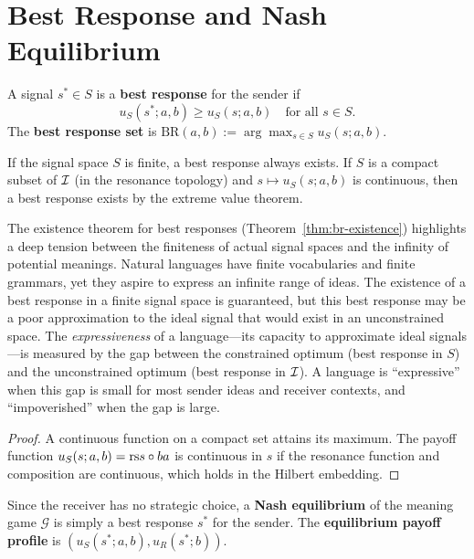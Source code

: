 \section{Best Response and Nash Equilibrium}

\begin{definition}
\label{def:best-response}
A signal $s^* \in S$ is a \textbf{best response} for the sender if
\[
  u_S(s^*; a, b) \geq u_S(s; a, b) \quad \text{for all } s \in S.
\]
The \textbf{best response set} is
$\mathrm{BR}(a, b) := \arg\max_{s \in S} u_S(s; a, b)$.
\end{definition}

\begin{theorem}
\label{thm:br-existence}
If the signal space $S$ is finite, a best response always exists.
If $S$ is a compact subset of $\mathcal{I}$ (in the resonance topology) and
$s \mapsto u_S(s; a, b)$ is continuous, then a best response exists
by the extreme value theorem.
\end{theorem}

\begin{remark}
\label{rem:ch14:br_existence_finiteness}
The existence theorem for best responses
(Theorem~\ref{thm:br-existence}) highlights a deep tension between the
finiteness of actual signal spaces and the infinity of potential meanings.
Natural languages have finite vocabularies and finite grammars, yet they
aspire to express an infinite range of ideas.  The existence of a best
response in a finite signal space is guaranteed, but this best response may
be a poor approximation to the ideal signal that would exist in an
unconstrained space.  The \emph{expressiveness} of a language---its capacity
to approximate ideal signals---is measured by the gap between the constrained
optimum (best response in $S$) and the unconstrained optimum
(best response in $\mathcal{I}$).  A language is ``expressive'' when this gap is
small for most sender ideas and receiver contexts, and ``impoverished''
when the gap is large.
\end{remark}



\begin{proof}
A continuous function on a compact set attains its maximum.  The payoff
function $u_S(s; a, b) = \mathrm{rs}{s \circ b}{a}$ is continuous in $s$ if the
resonance function and composition are continuous, which holds in the Hilbert
embedding.
\end{proof}

\begin{definition}
\label{def:nash-eq}
Since the receiver has no strategic choice, a \textbf{Nash equilibrium} of
the meaning game $\mathcal{G}$ is simply a best response $s^*$ for the sender.
The \textbf{equilibrium payoff profile} is
$(u_S(s^*; a, b), u_R(s^*; b))$.
\end{definition}

